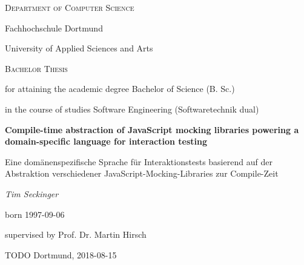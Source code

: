 {\centering
  {\small\scshape Department of Computer Science \par}
  {\large Fachhochschule Dortmund \par}
  {\large University of Applied Sciences and Arts \par}

  \vspace{10mm}

  {\large\scshape Bachelor Thesis\par}
  \vspace{5mm}
  {\small
  for attaining the academic degree Bachelor of Science (B. Sc.)\par
  in the course of studies Software Engineering (Softwaretechnik dual)\par
  }

  \vspace{20mm}

  {\huge\bfseries
    Compile-time abstraction of JavaScript mocking libraries
    powering a domain-specific language for interaction testing
  }

  {\small
    Eine domänenspezifische Sprache für Interaktionstests
    basierend auf der Abstraktion verschiedener JavaScript-Mocking-Libraries zur Compile-Zeit
  \par}

  \vspace{20mm}

  {\large\itshape
  Tim Seckinger\par
  \small born 1997-09-06\par
  }
  \vspace{5mm}
  {\small supervised by Prof. Dr. Martin Hirsch\par}

  \vfill

  {\large TODO Dortmund, 2018-08-15}
}
